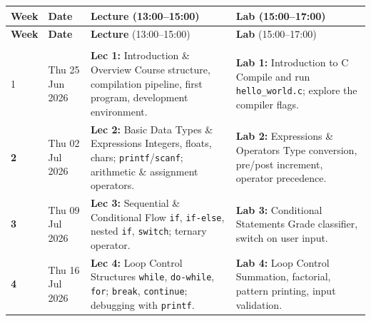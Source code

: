 \documentclass[11pt,a4paper]{article}
\begin{document}
\begin{longtable}{@{}
    >{\centering\bfseries}p{1.1cm}
    >{\centering}p{2.5cm}
    >{\RaggedRight}p{5.4cm}
    >{\RaggedRight}p{5.0cm}
  @{}}
  \toprule
  \textbf{Week} & \textbf{Date} & \textbf{Lecture} {\small(13:00--15:00)} & \textbf{Lab} {\small(15:00--17:00)} \\
  \midrule
  \endfirsthead
  \toprule
  \textbf{Week} & \textbf{Date} & \textbf{Lecture} {\small(13:00--15:00)} & \textbf{Lab} {\small(15:00--17:00)} \\
  \midrule
  \endhead
  \midrule
  \multicolumn{4}{r}{\small\itshape continued on next page}\\
  \endfoot
  \bottomrule
  \endlastfoot

  1 & Thu 25 Jun 2026
    & \textbf{Lec 1:} Introduction \& Overview\newline
      \small Course structure, compilation pipeline, first program, development environment.
    & \textbf{Lab 1:} Introduction to C\newline
      \small Compile and run \texttt{hello\_world.c}; explore the compiler flags. \\

  \rowcolor{rowalt}
  2 & Thu 02 Jul 2026
    & \textbf{Lec 2:} Basic Data Types \& Expressions\newline
      \small Integers, floats, chars; \texttt{printf}/\texttt{scanf}; arithmetic \& assignment operators.
    & \textbf{Lab 2:} Expressions \& Operators\newline
      \small Type conversion, pre/post increment, operator precedence. \\

  3 & Thu 09 Jul 2026
    & \textbf{Lec 3:} Sequential \& Conditional Flow\newline
      \small \texttt{if}, \texttt{if-else}, nested \texttt{if}, \texttt{switch}; ternary operator.
    & \textbf{Lab 3:} Conditional Statements\newline
      \small Grade classifier, switch on user input. \\

  \rowcolor{rowalt}
  4 & Thu 16 Jul 2026
    & \textbf{Lec 4:} Loop Control Structures\newline
      \small \texttt{while}, \texttt{do-while}, \texttt{for}; \texttt{break}, \texttt{continue}; debugging with \texttt{printf}.
    & \textbf{Lab 4:} Loop Control\newline
      \small Summation, factorial, pattern printing, input validation. \\


\end{longtable}
\end{document}
